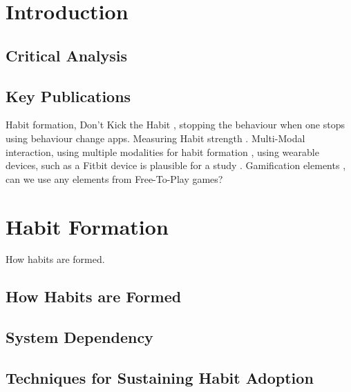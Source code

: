 \newpage
\section{Introduction} %


\subsection{Critical Analysis}


\subsection{Key Publications}

Habit formation, Don't Kick the Habit \cite{article_dont_kick_habit}, stopping the behaviour when one stops using behaviour change apps.\newline
Measuring Habit strength \cite{article_habit_strength} \cite{article_habit_measurement}.\newline
\newline
Multi-Modal interaction, using multiple modalities for habit formation \cite{}, using wearable devices, such as a Fitbit device is plausible for a study \cite{article_wearable_good}.\newline
\newline
Gamification elements \cite{f2p_games_how_to}, can we use any elements from Free-To-Play games?\newline
\newline


\newpage
\section{Habit Formation}
How habits are formed.

\subsection{How Habits are Formed}


\subsection{System Dependency}


\subsection{Techniques for Sustaining Habit Adoption}


